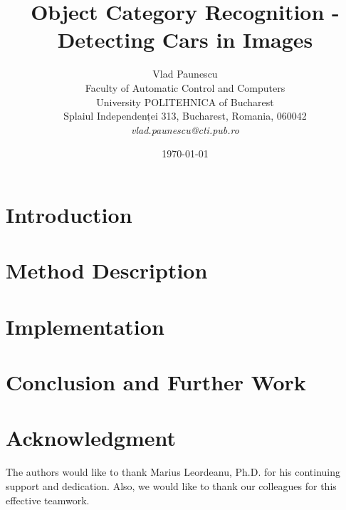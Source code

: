 \documentclass[12pt]{article}
\title{Object Category Recognition - Detecting Cars in Images}
\author{Vlad Paunescu\\
Faculty of Automatic Control and Computers\\
University POLITEHNICA of Bucharest\\
Splaiul Independenței 313, Bucharest, Romania, 060042 \\
\emph{vlad.paunescu@cti.pub.ro}}
\date{\today}
\begin{document}
\maketitle

\begin{abstract}

\end{abstract}

\section{Introduction}
\label{sec:introduction}



\section{Method Description}
\label{sec:architecture}


\section{Implementation}
\label{sec:implementation}


\section{Conclusion and Further Work}
\label{sec:conclusion}


\section*{Acknowledgment}
\label{sec:acknowledgment}

The authors would like to thank Marius Leordeanu, Ph.D. for his continuing support and dedication. Also, we would like to thank our colleagues for this effective teamwork.



\end{document}
